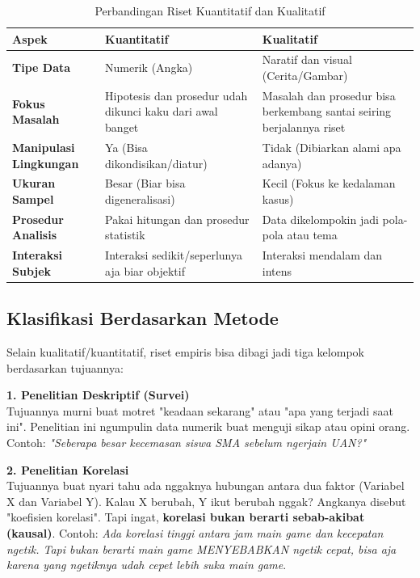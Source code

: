 \documentclass[12pt,a4paper]{article}
\begin{document}
\begin{table}[h]
\centering
\begin{tabular}{@{}p{3.5cm}p{5.5cm}p{5.5cm}@{}}
\toprule
\textbf{Aspek} & \textbf{Kuantitatif} & \textbf{Kualitatif} \\ \midrule
\textbf{Tipe Data} & Numerik (Angka) & Naratif dan visual (Cerita/Gambar) \\ \addlinespace
\textbf{Fokus Masalah} & Hipotesis dan prosedur udah dikunci kaku dari awal banget & Masalah dan prosedur bisa berkembang santai seiring berjalannya riset \\ \addlinespace
\textbf{Manipulasi Lingkungan} & Ya (Bisa dikondisikan/diatur) & Tidak (Dibiarkan alami apa adanya) \\ \addlinespace
\textbf{Ukuran Sampel} & Besar (Biar bisa digeneralisasi) & Kecil (Fokus ke kedalaman kasus) \\ \addlinespace
\textbf{Prosedur Analisis} & Pakai hitungan dan prosedur statistik & Data dikelompokin jadi pola-pola atau tema \\ \addlinespace
\textbf{Interaksi Subjek} & Interaksi sedikit/seperlunya aja biar objektif & Interaksi mendalam dan intens \\ \bottomrule
\end{tabular}
\caption{Perbandingan Riset Kuantitatif dan Kualitatif}
\end{table}

\subsection{Klasifikasi Berdasarkan Metode}
Selain kualitatif/kuantitatif, riset empiris bisa dibagi jadi tiga kelompok berdasarkan tujuannya:

\textbf{1. Penelitian Deskriptif (Survei)} \\
Tujuannya murni buat motret "keadaan sekarang" atau "apa yang terjadi saat ini". Penelitian ini ngumpulin data numerik buat menguji sikap atau opini orang. Contoh: \textit{"Seberapa besar kecemasan siswa SMA sebelum ngerjain UAN?"}

\textbf{2. Penelitian Korelasi} \\
Tujuannya buat nyari tahu ada nggaknya hubungan antara dua faktor (Variabel X dan Variabel Y). Kalau X berubah, Y ikut berubah nggak? Angkanya disebut "koefisien korelasi". Tapi ingat, \textbf{korelasi bukan berarti sebab-akibat (kausal)}. Contoh: \textit{Ada korelasi tinggi antara jam main game dan kecepatan ngetik. Tapi bukan berarti main game MENYEBABKAN ngetik cepat, bisa aja karena yang ngetiknya udah cepet lebih suka main game}.
\end{document}
